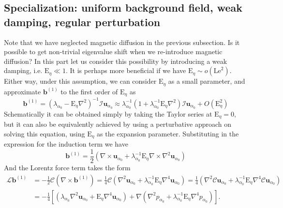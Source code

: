 \subsection{Specialization: uniform background field, weak damping, regular perturbation}

Note that we have neglected magnetic diffusion in the previous subsection. Is it possible to get non-trivial eigenvalue shift when we re-introduce magnetic diffusion? In this part let us consider this possibility by introducing a weak damping, i.e. $\mathrm{E}_\eta \ll 1$. It is perhaps more beneficial if we have $\mathrm{E}_\eta \sim o\left(\mathrm{Le}^2\right)$. Either way, under this assumption, we can consider $\mathrm{E}_\eta$ as a small parameter, and approximate $\mathbf{b}^{(1)}$ to the first order of $\mathrm{E}_\eta$ as
%
\begin{equation}
    \mathbf{b}^{(1)} = \left(\lambda_{\alpha_0} - \mathrm{E}_\eta\nabla^2 \right)^{-1} \mathcal{I} \mathbf{u}_{\alpha_0} \approx \lambda_{\alpha_0}^{-1} \left(1 + \lambda_{\alpha_0}^{-1} \mathrm{E}_\eta \nabla^2\right) \mathcal{I} \mathbf{u}_{\alpha_0} + O(\mathrm{E}_\eta^2)
\end{equation}
%
Schematically it can be obtained simply by taking the Taylor series at $\mathrm{E}_\eta=0$, but it can also be equivalently achieved by using a perturbative approach on solving this equation, using $\mathrm{E}_\eta$ as the expansion parameter. Substituting in the expression for the induction term we have
%
\begin{equation}
    \mathbf{b}^{(1)} = \frac{1}{2} \left(\nabla\times \mathbf{u}_{\alpha_0} + \lambda_{\alpha_0}^{-1} \mathrm{E}_\eta \nabla\times \nabla^2 \mathbf{u}_{\alpha_0}\right)
\end{equation}
%
And the Lorentz force term takes the form
%
\begin{equation}
\begin{aligned}
    \mathcal{L} \mathbf{b}^{(1)} &= - \frac{1}{2} \mathcal{C} \left(\nabla\times \mathbf{b}^{(1)}\right) = \frac{1}{4} \mathcal{C} \left(\nabla^2 \mathbf{u}_{\alpha_0} + \lambda_{\alpha_0}^{-1} \mathrm{E}_\eta \nabla^4 \mathbf{u}_{\alpha_0}\right) = \frac{1}{4} \left(\nabla^2 \mathcal{C} \mathbf{u}_{\alpha_0} + \lambda_{\alpha_0}^{-1} \mathrm{E}_\eta \nabla^4 \mathcal{C} \mathbf{u}_{\alpha_0}\right) \\
    &= - \frac{1}{4} \left[ \left(\lambda_{\alpha_0} \nabla^2 \mathbf{u}_{\alpha_0} + \mathrm{E}_\eta \nabla^4 \mathbf{u}_{\alpha_0}\right) + \nabla \left(\nabla^2 p_{\alpha_0} + \lambda_{\alpha_0}^{-1} \mathrm{E}_\eta \nabla^4 p_{\alpha_0}\right) \right].
\end{aligned}
\end{equation}
